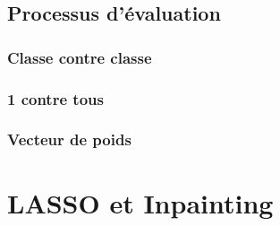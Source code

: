 \documentclass[a4paper]{memoir}
\begin{document}
\subsection{Processus d'évaluation}
\subsubsection{Classe contre classe}


\subsubsection{1 contre tous}



\subsubsection{Vecteur de poids}



\newpage
\section{LASSO et Inpainting}
\end{document}

